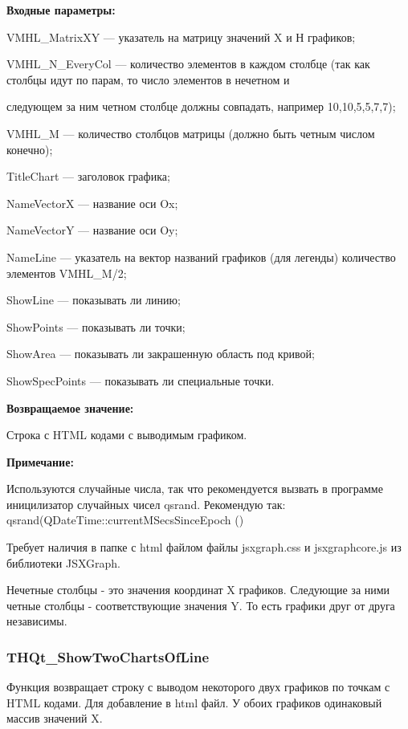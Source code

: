 \documentclass[a4paper,12pt]{article}
\begin{document}
\textbf{Входные параметры:}
 
VMHL\_MatrixXY --- указатель на матрицу значений X и Н графиков;
 
VMHL\_N\_EveryCol --- количество элементов в каждом столбце (так как столбцы идут по парам, то число элементов в нечетном и
 
следующем за ним четном столбце должны совпадать, например 10,10,5,5,7,7);
 
VMHL\_M --- количество столбцов матрицы (должно быть четным числом конечно);
 
TitleChart --- заголовок графика;
 
NameVectorX --- название оси Ox;
 
NameVectorY --- название оси Oy;
 
NameLine --- указатель на вектор названий графиков (для легенды) количество элементов VMHL\_M/2;
 
ShowLine --- показывать ли линию;
 
ShowPoints --- показывать ли точки;
 
ShowArea --- показывать ли закрашенную область под кривой;
 
ShowSpecPoints --- показывать ли специальные точки.

\textbf{Возвращаемое значение:}

Строка с HTML кодами с выводимым графиком.

\textbf{Примечание:}

Используются случайные числа, так что рекомендуется вызвать в программе иницилизатор случайных чисел qsrand. Рекомендую так: qsrand(QDateTime::currentMSecsSinceEpoch () %

Требует наличия в папке с html файлом файлы jsxgraph.css и jsxgraphcore.js из библиотеки JSXGraph.

Нечетные столбцы - это значения координат X графиков. Следующие за ними четные столбцы - соответствующие значения Y. То есть графики друг от друга независимы.


\subsubsection{THQt\_ShowTwoChartsOfLine}\label{THQt_ShowTwoChartsOfLine}

Функция возвращает строку с выводом некоторого двух графиков по точкам с HTML кодами. Для добавление в html файл. У обоих графиков одинаковый массив значений X.
\end{document}
